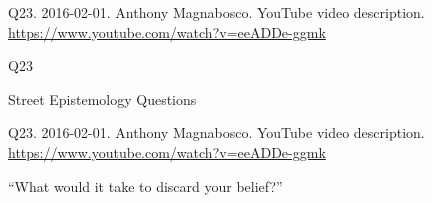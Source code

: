 \documentclass[
    src/templates/5x2-on-a4paper,
    frame
]{flashcards}
\newcommand{\myheader}{}
\newcommand{\myfooter}{
    \begin{flushright}
        \small\sc
        Street Epistemology Questions \par
    \end{flushright}
}
\begin{document}
        \renewcommand{\myheader}{
            \normalfont %
            \begin{tiny}
                Q23.
                2016-02-01.
                Anthony Magnabosco.
                    YouTube video description.
                    \\
                    \url{ https://www.youtube.com/watch?v=eeADDe-ggmk }
                \par
            \end{tiny}
        }
        \begin{flashcard}{
            \myheader
            \vspace{\fill}
            \begin{center}
                \large
                    Q23
            \end{center}
            \vspace{\fill}
            \myfooter
            \vspace{-1.4ex}
        }
            \myheader
            \vspace{\fill}
            \begin{center}
                \large
\enquote{What would it take to discard your belief?}            \end{center}
            \vspace{\fill}
        \end{flashcard}
\end{document}
